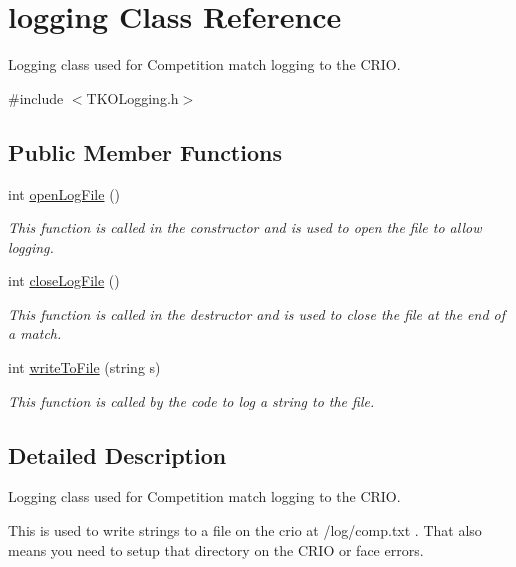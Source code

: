 \hypertarget{classlogging}{\section{logging Class Reference}
\label{classlogging}
}


Logging class used for Competition match logging to the C\-R\-I\-O.  




{\ttfamily \#include $<$T\-K\-O\-Logging.\-h$>$}

\subsection*{Public Member Functions}
\begin{DoxyCompactItemize}
\item 
int \hyperlink{classlogging_abf85b67f1af4a0d07688de0a28732f26}{open\-Log\-File} ()
\begin{DoxyCompactList}\small\item\em This function is called in the constructor and is used to open the file to allow logging. \end{DoxyCompactList}\item 
int \hyperlink{classlogging_a64ba1172f5c9b91f06da8b0d98be0aff}{close\-Log\-File} ()
\begin{DoxyCompactList}\small\item\em This function is called in the destructor and is used to close the file at the end of a match. \end{DoxyCompactList}\item 
int \hyperlink{classlogging_ab0662a992d8c4aa97f41762f55d20876}{write\-To\-File} (string s)
\begin{DoxyCompactList}\small\item\em This function is called by the code to log a string to the file. \end{DoxyCompactList}\end{DoxyCompactItemize}


\subsection{Detailed Description}
Logging class used for Competition match logging to the C\-R\-I\-O. 

This is used to write strings to a file on the crio at /log/comp.txt . That also means you need to setup that directory on the C\-R\-I\-O or face errors. 

